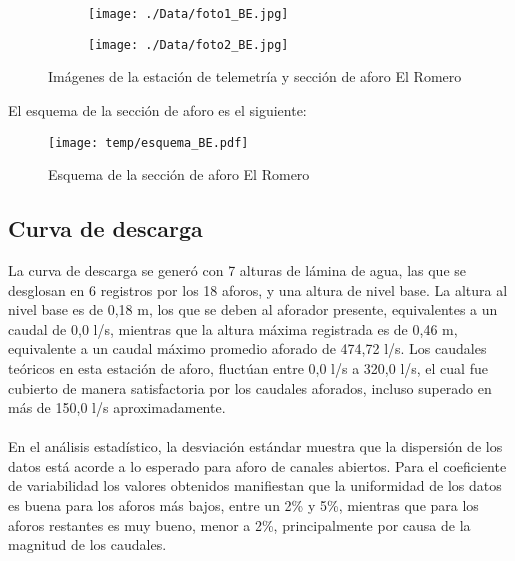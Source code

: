 \documentclass[]{article}
\begin{document}
\begin{figure}[H]
  \centering
\begin{subfigure}{.49\textwidth}
  \texttt{[image: ./Data/foto1\_BE.jpg]}
\end{subfigure}
\hfill
\begin{subfigure}{.49\textwidth}
  \texttt{[image: ./Data/foto2\_BE.jpg]}
\end{subfigure}
\caption{Imágenes de la estación de telemetría y sección de aforo El Romero}
\label{fig:fotos_31}
\end{figure}

El esquema de la sección de aforo es el siguiente:

\begin{figure}[H]
  \centering
  \texttt{[image: temp/esquema\_BE.pdf]}
\caption{Esquema de la sección de aforo El Romero}
\label{fig:Esquema_BE}
\end{figure}

\subsection{Curva de descarga}\label{curva-de-descarga-30}

La curva de descarga se generó con 7 alturas de lámina de agua, las que se desglosan en 6 registros por los 18 aforos, y una altura de nivel base. La altura al nivel base es de 0,18 m, los que se deben al aforador presente, equivalentes a un caudal de 0,0 l/s, mientras que la altura máxima registrada es de 0,46 m, equivalente a un caudal máximo promedio aforado de 474,72 l/s. Los caudales teóricos en esta estación de aforo, fluctúan entre 0,0 l/s a 320,0 l/s, el cual fue cubierto de manera satisfactoria por los caudales aforados, incluso superado en más de 150,0 l/s aproximadamente.\\
\\
En el análisis estadístico, la desviación estándar muestra que la dispersión de los datos está acorde a lo esperado para aforo de canales abiertos. Para el coeficiente de variabilidad los valores obtenidos manifiestan que la uniformidad de los datos es buena para los aforos más bajos, entre un 2\% y 5\%, mientras que para los aforos restantes es muy bueno, menor a 2\%, principalmente por causa de la magnitud de los caudales.
\end{document}
